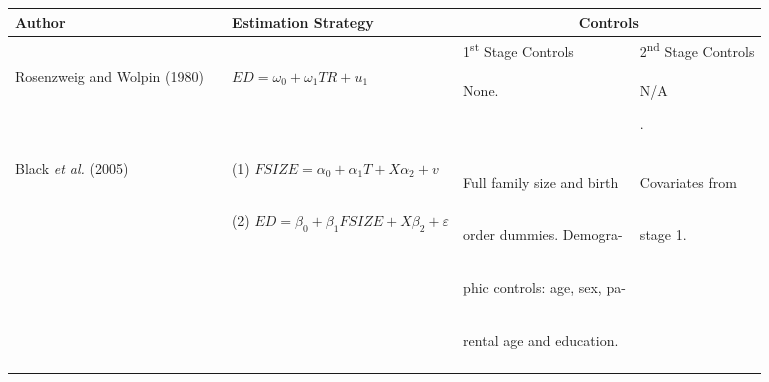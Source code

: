 \documentclass{article}[11pt,subeqn]
\begin{document}
\begin{spacing}{1.5}
\begin{center}
\begin{rotate}{90}
\begin{tabular}{lp{4mm}lll}\toprule
Author& &  Estimation Strategy & \multicolumn{2}{c}{Controls} \\ \midrule
&& & \hspace{5mm}1\textsuperscript{st} Stage Controls & 2\textsuperscript{nd} Stage Controls \\  \cmidrule(r){4-4} \cmidrule{5-5}
Rosenzweig and Wolpin (1980) & &
$ED=\omega_0+\omega_1 TR+u_1$&
\begin{small}None.\end{small}&
\begin{small}N\slash A\end{small}.
\\
\begin{footnotesize}\end{footnotesize}&\begin{footnotesize}\end{footnotesize}&\begin{footnotesize}\end{footnotesize}&\begin{footnotesize}\end{footnotesize}&\begin{footnotesize}\end{footnotesize}\\
\multirow{2}{*}{Black \emph{et al.} (2005)} & &
(1) $FSIZE=\alpha_0 + \alpha_1 T + X\alpha_2 + v$ &
\begin{small}Full family size and  birth \end{small}&
\begin{small}Covariates from\end{small}
\\
& &
(2) $ED=\beta_0+\beta_1 FSIZE + X\beta_2 + \varepsilon$ &
\begin{small}order dummies. Demogra-\end{small}  &
\begin{small}stage 1.\end{small}
\\
& & &
\begin{small}phic controls: age, sex, pa-\end{small}&
\\
& & &
\begin{small}rental age and education.\end{small}&
\\
\begin{footnotesize}\end{footnotesize}&\begin{footnotesize}\end{footnotesize}&\begin{footnotesize}\end{footnotesize}&\begin{footnotesize}\end{footnotesize}&\begin{footnotesize}\end{footnotesize}\\

\end{tabular}
\end{rotate}
\end{center}
\end{spacing}
\end{document}
